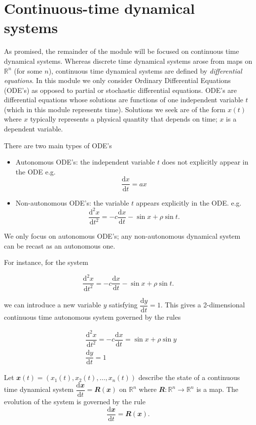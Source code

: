 \documentclass[
  a4paper,
  oneside,
  final]{krantz}
\providecommand{\tightlist}{%
  \setlength{\itemsep}{0pt}\setlength{\parskip}{0pt}}
\newcommand{\R}{\mathbb{R}}
\renewcommand{\d}{\mathrm{d}}
\renewcommand{\v}[1]{{\mathbfit{#1}}}
\newcommand{\der}[2]{\dfrac{\d #1}{\d #2}}
\newcommand{\dern}[3]{\dfrac{\d^{#3} #1}{\d #2 ^{#3}}}
\theoremstyle{definition}
\theoremstyle{definition}
\theoremstyle{definition}
\theoremstyle{definition}
\theoremstyle{remark}
\begin{document}
\hypertarget{continuous-time-dynamical-systems-section}{%
\section{Continuous-time dynamical systems}\label{continuous-time-dynamical-systems-section}}

As promised, the remainder of the module will be focused on continuous time dynamical systems. Whereas discrete time dynamical systems arose from maps on \(\R^{n}\) (for some \(n\)), continuous time dynamical systems are defined by \emph{differential equations}. In this module we only consider Ordinary Differential Equations (ODE's) as opposed to partial or stochastic differential equations. ODE's are differential equations whose solutions are functions of one independent variable \(t\) (which in this module represents time). Solutions we seek are of the form \(x(t)\) where \(x\) typically represents a physical quantity that depends on time; \(x\) is a dependent variable.

There are two main types of ODE's

\begin{itemize}
\tightlist
\item
  Autonomous ODE's: the independent variable \(t\) does not explicitly appear in the ODE e.g.
  \[ \der{x}{t} = ax\]
\item
  Non-autonomous ODE's: the variable \(t\) appears explicitly in the ODE. e.g.
  \[ \dern{x}{t}{2} = -c \der{x}{t}  - \sin x + \rho \sin t.\]
\end{itemize}

We only focus on autonomous ODE's; any non-autonomous dynamical system can be recast as an autonomous one.

For instance, for the system

\[ \dern{x}{t}{2} = -c \der{x}{t}  - \sin x + \rho \sin t.\]

we can introduce a new variable \(y\) satisfying \(\der{y}{t} = 1\). This gives a 2-dimensional continuous time autonomous system governed by the rules

\begin{align*}
&\dern{x}{t}{2} = -c \der{x}{t} = \sin x + \rho \sin y \\
& \der{y}{t} = 1
\end{align*}

Let \(\v{x}(t) = ( x_1(t), x_2(t), \ldots, x_{n}(t))\) describe the state of a continuous time dynamical system \(\der{\v{x}}{t} = \v{R}(\v{x})\) on \(\R^{n}\) where \(\v{R}: \R^{n} \to \R^{n}\) is a map. The evolution of the system is governed by the rule
\[\der{\v{x}}{t} = \v{R}(\v{x}).\]
\end{document}
